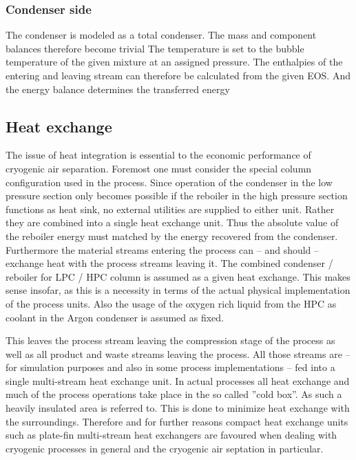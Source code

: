         \subsubsection{Condenser side}
            The condenser is modeled as a total condenser. The mass and component balances therefore become trivial 
            The temperature is set to the bubble temperature of the given mixture at an assigned pressure. The 
            enthalpies of the entering and leaving stream can therefore be calculated from the given EOS. And
            the energy balance determines the transferred energy

\subsection{Heat exchange}
\label{sec:mathpro:steady:hx}
    The issue of heat integration is essential to the economic performance of cryogenic air separation. Foremost
    one must consider the special column configuration used in the process. Since operation of the condenser in the
    low pressure section only becomes possible if the reboiler in the high pressure section functions as heat sink,
    no external utilities are supplied to either unit. Rather they are combined into a single heat exchange unit. Thus
    the absolute value of the reboiler energy must matched by the energy recovered from the condenser. Furthermore
    the material streams entering the process can -- and should -- exchange heat with the process streams leaving it.
    The combined condenser / reboiler for LPC / HPC column is assumed as a given heat exchange. This makes sense insofar,
    as this is a necessity in terms of the actual physical implementation of the process units. Also the usage of the
    oxygen rich liquid from the HPC as coolant in the Argon condenser is assumed as fixed.

    This leaves the process stream leaving the compression stage of the process as well as all product and waste streams
    leaving the process. All those streams are -- for simulation purposes and also in some process implementations  -- fed
    into a single multi-stream heat exchange unit. In actual processes all heat exchange and much of the process operations
    take place in the so called ''cold box''. As such a heavily insulated area is referred to. This is done to minimize
    heat exchange with the surroundings. Therefore and for further reasons compact heat exchange units such as plate-fin
    multi-stream heat exchangers are favoured when dealing with cryogenic processes in general and the cryogenic air septation
    in particular.

